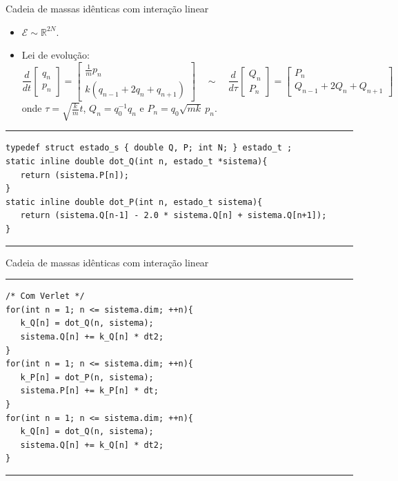 \documentclass{beamer}
\begin{document}
\begin{frame}[fragile]{Cadeia de massas idênticas com interação linear}

   \begin{itemize}
      \item $\mathcal E \sim \mathbb R^{2N}$.
      \item Lei de evolução:
      \begin{equation}
         \frac{d}{dt}
         \begin{bmatrix} q_n \\ p_n \end{bmatrix} =
         \begin{bmatrix}
            \frac{1}{m} p_n \\
            k (q_{n-1} + 2 q_n + q_{n+1})
         \end{bmatrix}
         \quad\sim\quad
         \frac{d}{d\tau}
         \begin{bmatrix} Q_n \\ P_n \end{bmatrix} =
         \begin{bmatrix} P_n \\ Q_{n-1} + 2 Q_n + Q_{n+1} \end{bmatrix}
      \end{equation}
      onde
      $\tau = \sqrt{\frac{k}{m}} t$,
      $Q_n = q_0^{-1} q_n$ e
      $P_n = q_0 \sqrt{m k} ~ p_n$.
   \end{itemize}

   \rule{\textwidth}{1pt}
   \scriptsize
\begin{lstlisting}[style = c]
typedef struct estado_s { double Q, P; int N; } estado_t ;
static inline double dot_Q(int n, estado_t *sistema){
   return (sistema.P[n]);
}
static inline double dot_P(int n, estado_t sistema){
   return (sistema.Q[n-1] - 2.0 * sistema.Q[n] + sistema.Q[n+1]);
}
\end{lstlisting}
   \rule{\textwidth}{1pt}
\end{frame}

\begin{frame}[fragile]{Cadeia de massas idênticas com interação linear}
   \rule{\textwidth}{1pt}
   \scriptsize
\begin{lstlisting}[style = c]
/* Com Verlet */
for(int n = 1; n <= sistema.dim; ++n){
   k_Q[n] = dot_Q(n, sistema);
   sistema.Q[n] += k_Q[n] * dt2;
}
for(int n = 1; n <= sistema.dim; ++n){
   k_P[n] = dot_P(n, sistema);
   sistema.P[n] += k_P[n] * dt;
}
for(int n = 1; n <= sistema.dim; ++n){
   k_Q[n] = dot_Q(n, sistema);
   sistema.Q[n] += k_Q[n] * dt2;
}
\end{lstlisting}
   \rule{\textwidth}{1pt}
\end{frame}
\end{document}

